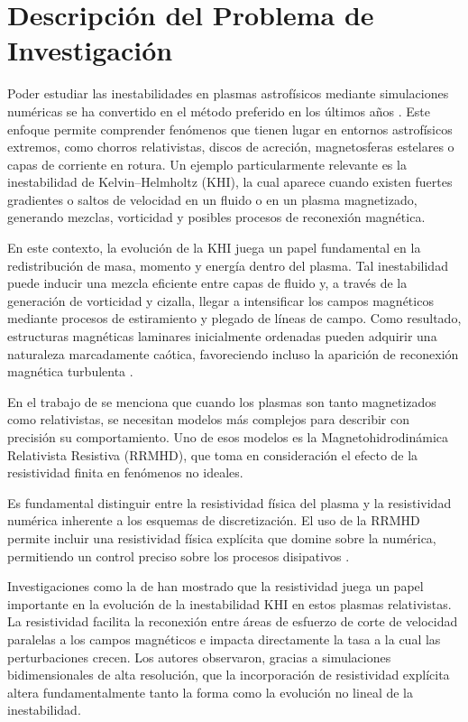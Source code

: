 \section{Descripción del Problema de Investigación}
\noindent 
Poder estudiar las inestabilidades en plasmas astrofísicos mediante simulaciones numéricas se ha convertido en el método preferido en los últimos años \citep{Perucho2023}. Este enfoque permite comprender fenómenos que tienen lugar en entornos astrofísicos extremos, como chorros relativistas, discos de acreción, magnetosferas estelares o capas de corriente en rotura. Un ejemplo particularmente relevante es la inestabilidad de Kelvin–Helmholtz (KHI), la cual aparece cuando existen fuertes gradientes o saltos de velocidad en un fluido o en un plasma magnetizado, generando mezclas, vorticidad y posibles procesos de reconexión magnética.

En este contexto, la evolución de la KHI juega un papel fundamental en la redistribución de masa, momento y energía dentro del plasma. Tal inestabilidad puede inducir una mezcla eficiente entre capas de fluido y, a través de la generación de vorticidad y cizalla, llegar a intensificar los campos magnéticos mediante procesos de estiramiento y plegado de líneas de campo. Como resultado, estructuras magnéticas laminares inicialmente ordenadas pueden adquirir una naturaleza marcadamente caótica, favoreciendo incluso la aparición de reconexión magnética turbulenta \citep{hasegawa2004}.

En el trabajo de \cite{osmanov-2008} se menciona que cuando los plasmas son tanto magnetizados como relativistas, se necesitan modelos más complejos para describir con precisión su comportamiento. Uno de esos modelos es la Magnetohidrodinámica Relativista Resistiva (RRMHD), que toma en consideración el efecto de la resistividad finita en fenómenos no ideales.

Es fundamental distinguir entre la resistividad física del plasma y la resistividad numérica inherente a los esquemas de discretización. El uso de la RRMHD permite incluir una resistividad física explícita que domine sobre la numérica, permitiendo un control preciso sobre los procesos disipativos \citep{Komissarov2007}.

Investigaciones como la de \cite{pimentel-2019} han mostrado que la resistividad juega un papel importante en la evolución de la inestabilidad KHI en estos plasmas relativistas. La resistividad facilita la reconexión entre áreas de esfuerzo de corte de velocidad paralelas a los campos magnéticos e impacta directamente la tasa a la cual las perturbaciones crecen. Los autores observaron, gracias a simulaciones bidimensionales de alta resolución, que la incorporación de resistividad explícita altera fundamentalmente tanto la forma como la evolución no lineal de la inestabilidad.

